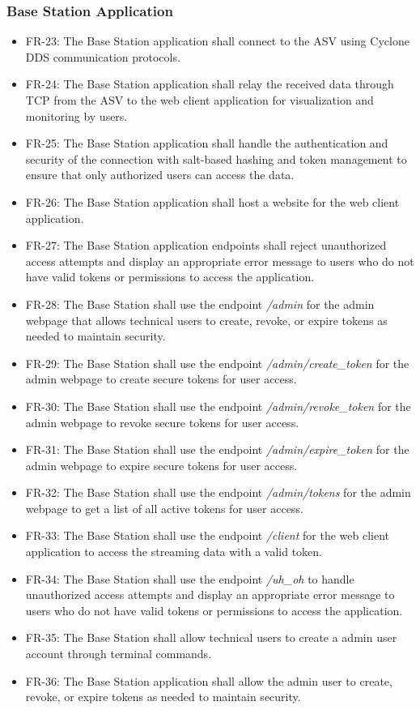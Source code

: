 \subsubsection{Base Station Application}
\begin{itemize}
    \item FR-23: The Base Station application shall connect to the ASV using Cyclone DDS communication protocols.
    \item FR-24: The Base Station application shall relay the received data through TCP from the ASV to the web client application for visualization and monitoring by users.
    \item FR-25: The Base Station application shall handle the authentication and security of the connection with salt-based hashing and token management to ensure that only authorized users can access the data.
    \item FR-26: The Base Station application shall host a website for the web client application.
    \item FR-27: The Base Station application endpoints shall reject unauthorized access attempts and display an appropriate error message to users who do not have valid tokens or permissions to access the application.
    \item FR-28: The Base Station shall use the endpoint \textit{/admin} for the admin webpage that allows technical users to create, revoke, or expire tokens as needed to maintain security.
    \item FR-29: The Base Station shall use the endpoint \textit{/admin/create\_token} for the admin webpage to create secure tokens for user access.
    \item FR-30: The Base Station shall use the endpoint \textit{/admin/revoke\_token} for the admin webpage to revoke secure tokens for user access.
    \item FR-31: The Base Station shall use the endpoint \textit{/admin/expire\_token} for the admin webpage to expire secure tokens for user access.
    \item FR-32: The Base Station shall use the endpoint \textit{/admin/tokens} for the admin webpage to get a list of all active tokens for user access.
    \item FR-33: The Base Station shall use the endpoint \textit{/client} for the web client application to access the streaming data with a valid token.
    \item FR-34: The Base Station shall use the endpoint \textit{/uh\_oh} to handle unauthorized access attempts and display an appropriate error message to users who do not have valid tokens or permissions to access the application.
    \item FR-35: The Base Station shall allow technical users to create a admin user account through terminal commands.
    \item FR-36: The Base Station application shall allow the admin user to create, revoke, or expire tokens as needed to maintain security.
\end{itemize}

